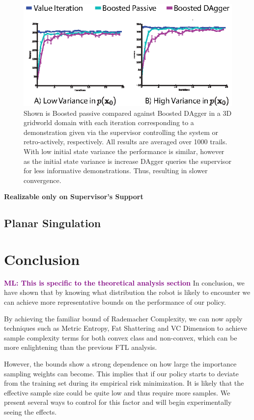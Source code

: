 \documentclass[10pt, conference]{ieeeconf}      %
\newcommand{\mlnote}[1]{\ifthenelse{ \boolean{include-notes}}%
 {\textcolor{purple}{\textbf{ML: #1}}}{}}
\begin{document}
\begin{figure}
\centering
\includegraphics{f_figs/r_ev.eps}
\caption{
    \footnotesize
Shown is Boosted passive compared against Boosted DAgger in a 3D gridworld domain with each iteration corresponding to a demonstration given via the supervisor controlling the system or retro-actively, respectively. All results are averaged over 1000 trails. With low initial state variance the performance is similar, however as the initial state variance is increase DAgger queries the supervisor for less informative demonstrations. Thus, resulting in slower convergence.   }
\vspace*{-20pt}
\label{fig:r_eq}
\end{figure}



\noindent \textbf{Realizable only on Supervisor's Support} 


\subsection{Planar Singulation}




  



\section{Conclusion}
\mlnote{This is specific to the theoretical analysis section}
In conclusion, we have shown that by knowing what distribution the robot is likely to encounter we can achieve more representative bounds on the performance of our policy. 

By achieving the familiar bound of Rademacher Complexity, we can now apply techniques such as Metric Entropy, Fat Shattering and VC Dimension to achieve sample complexity terms for both convex class and non-convex, which can be more enlightening than the previous FTL analysis. 

However, the bounds show a strong dependence on how large the importance sampling weights can become. This implies that if our policy starts to deviate from the training set during its empirical risk minimization. It is likely that the effective sample size could be quite low and thus require more samples. We present several ways to control for this factor and will begin experimentally seeing the effects.  



\end{document}
